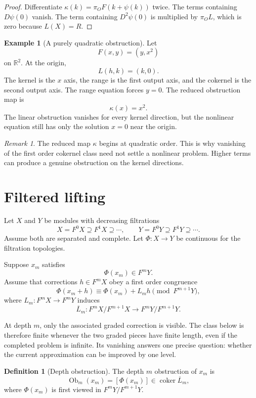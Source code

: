 \documentclass{aomart}
\theoremstyle{definition}
\newtheorem{definition}[definition]{Definition}
\newtheorem{example}[example]{Example}
\theoremstyle{remark}
\newtheorem{remark}[remark]{Remark}
\newcommand{\coker}{\operatorname{coker}}
\newcommand{\Ob}{\operatorname{Ob}}
\begin{document}
\begin{proof}
Differentiate $\kappa(k)=\pi_OF(k+\psi(k))$ twice.  The terms containing $D\psi(0)$ vanish.  The term containing $D^2\psi(0)$ is multiplied by $\pi_OL$, which is zero because $L(X)=R$.
\end{proof}

\begin{example}[A purely quadratic obstruction]\label{ex:pure_quadratic_obstruction}
Let
\[
F(x,y)=(y,x^2)
\]
on $\mathbb R^2$.  At the origin,
\[
L(h,k)=(k,0).
\]
The kernel is the $x$ axis, the range is the first output axis, and the cokernel is the second output axis.  The range equation forces $y=0$.  The reduced obstruction map is
\[
\kappa(x)=x^2.
\]
The linear obstruction vanishes for every kernel direction, but the nonlinear equation still has only the solution $x=0$ near the origin.
\end{example}

\begin{remark}\label{rem:higher_obstruction}
The reduced map $\kappa$ begins at quadratic order.  This is why vanishing of the first order cokernel class need not settle a nonlinear problem.  Higher terms can produce a genuine obstruction on the kernel directions.
\end{remark}

\section{Filtered lifting}\label{sec:filtered_lifting}

Let $X$ and $Y$ be modules with decreasing filtrations
\[
X=F^0X\supseteq F^1X\supseteq\cdots,
\qquad
Y=F^0Y\supseteq F^1Y\supseteq\cdots.
\]
Assume both are separated and complete.  Let $\Phi:X\to Y$ be continuous for the filtration topologies.

Suppose $x_m$ satisfies
\[
\Phi(x_m)\in F^mY.
\]
Assume that corrections $h\in F^mX$ obey a first order congruence
\[
\Phi(x_m+h)
\equiv
\Phi(x_m)+L_mh
\pmod{F^{m+1}Y},
\]
where $L_m:F^mX\to F^mY$ induces
\[
\overline L_m:
F^mX/F^{m+1}X
\longrightarrow
F^mY/F^{m+1}Y.
\]


At depth $m$, only the associated graded correction is visible.  The class below is therefore finite whenever the two graded pieces have finite length, even if the completed problem is infinite.  Its vanishing answers one precise question: whether the current approximation can be improved by one level.

\begin{definition}[Depth obstruction]\label{def:depth_obstruction}
The depth $m$ obstruction of $x_m$ is
\[
\Ob_m(x_m)
=
[\Phi(x_m)]
\in
\coker\overline L_m,
\]
where $\Phi(x_m)$ is first viewed in $F^mY/F^{m+1}Y$.
\end{definition}
\end{document}
